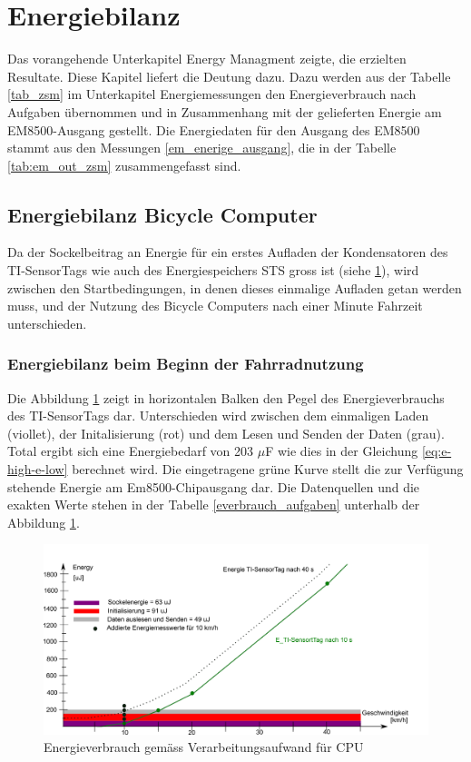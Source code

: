\section{Energiebilanz}

Das vorangehende Unterkapitel Energy Managment zeigte, die erzielten Resultate. Diese Kapitel liefert die Deutung dazu. Dazu werden aus der Tabelle \ref{tab_zsm} im Unterkapitel Energiemessungen den Energieverbrauch nach Aufgaben übernommen und in Zusammenhang mit der gelieferten Energie am EM8500-Ausgang gestellt. Die Energiedaten für den Ausgang des EM8500 stammt aus den Messungen \ref{em_enerige_ausgang}, die in der Tabelle \ref{tab:em_out_zsm} zusammengefasst sind.

\subsection{Energiebilanz Bicycle Computer}

Da der Sockelbeitrag an Energie für ein erstes Aufladen der Kondensatoren des TI-SensorTags wie auch des Energiespeichers STS gross ist (siehe \ref{r_bild_e_zusammenfassung}), wird zwischen den Startbedingungen, in denen dieses einmalige Aufladen getan werden muss, und der Nutzung des Bicycle Computers nach einer Minute Fahrzeit unterschieden.


\subsubsection{Energiebilanz beim Beginn der Fahrradnutzung}

Die Abbildung \ref{r_bild_e_zusammenfassung} zeigt in horizontalen Balken den Pegel des Energieverbrauchs des TI-SensorTags dar. Unterschieden wird zwischen dem einmaligen Laden (viollet), der Initalisierung (rot) und dem Lesen und Senden der Daten (grau). Total ergibt sich eine Energiebedarf von 203 $\mu$F wie dies in der Gleichung \ref{eq:e-high-e-low} berechnet wird. Die eingetragene grüne Kurve stellt die zur Verfügung stehende Energie am Em8500-Chipausgang dar. Die Datenquellen und die exakten Werte stehen in der Tabelle \ref{everbrauch_aufgaben} unterhalb der Abbildung \ref{r_bild_e_zusammenfassung}.

\begin{figure}[ht]
     \includegraphics[width=1\textwidth]{4Resultate/imag/EnergyVerbrauchZusammenfassung.png}
     \caption{Energieverbrauch gem\"{a}ss Verarbeitungsaufwand für CPU}
     \label{r_bild_e_zusammenfassung}
\end{figure}

